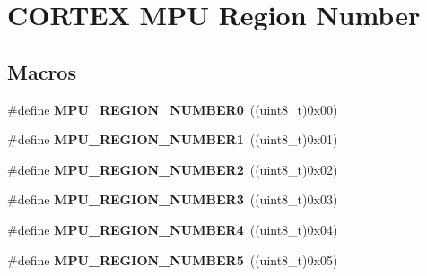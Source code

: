 \hypertarget{group___c_o_r_t_e_x___m_p_u___region___number}{}\section{C\+O\+R\+T\+EX M\+PU Region Number}
\label{group___c_o_r_t_e_x___m_p_u___region___number}
\subsection*{Macros}
\begin{DoxyCompactItemize}
\item 
\#define {\bfseries M\+P\+U\+\_\+\+R\+E\+G\+I\+O\+N\+\_\+\+N\+U\+M\+B\+E\+R0}~((uint8\+\_\+t)0x00)\hypertarget{group___c_o_r_t_e_x___m_p_u___region___number_ga53068f251f796975f404b1824d213b14}{}\label{group___c_o_r_t_e_x___m_p_u___region___number_ga53068f251f796975f404b1824d213b14}

\item 
\#define {\bfseries M\+P\+U\+\_\+\+R\+E\+G\+I\+O\+N\+\_\+\+N\+U\+M\+B\+E\+R1}~((uint8\+\_\+t)0x01)\hypertarget{group___c_o_r_t_e_x___m_p_u___region___number_ga37ddb62fe962b9ac2892f3897d4d3018}{}\label{group___c_o_r_t_e_x___m_p_u___region___number_ga37ddb62fe962b9ac2892f3897d4d3018}

\item 
\#define {\bfseries M\+P\+U\+\_\+\+R\+E\+G\+I\+O\+N\+\_\+\+N\+U\+M\+B\+E\+R2}~((uint8\+\_\+t)0x02)\hypertarget{group___c_o_r_t_e_x___m_p_u___region___number_gac742847caa0ef4ba134de7e7c4d64838}{}\label{group___c_o_r_t_e_x___m_p_u___region___number_gac742847caa0ef4ba134de7e7c4d64838}

\item 
\#define {\bfseries M\+P\+U\+\_\+\+R\+E\+G\+I\+O\+N\+\_\+\+N\+U\+M\+B\+E\+R3}~((uint8\+\_\+t)0x03)\hypertarget{group___c_o_r_t_e_x___m_p_u___region___number_ga708feb6a8e67c9cdb14d102580a26a5a}{}\label{group___c_o_r_t_e_x___m_p_u___region___number_ga708feb6a8e67c9cdb14d102580a26a5a}

\item 
\#define {\bfseries M\+P\+U\+\_\+\+R\+E\+G\+I\+O\+N\+\_\+\+N\+U\+M\+B\+E\+R4}~((uint8\+\_\+t)0x04)\hypertarget{group___c_o_r_t_e_x___m_p_u___region___number_ga553d48843769fcc4ce95969e8c039f71}{}\label{group___c_o_r_t_e_x___m_p_u___region___number_ga553d48843769fcc4ce95969e8c039f71}

\item 
\#define {\bfseries M\+P\+U\+\_\+\+R\+E\+G\+I\+O\+N\+\_\+\+N\+U\+M\+B\+E\+R5}~((uint8\+\_\+t)0x05)\hypertarget{group___c_o_r_t_e_x___m_p_u___region___number_ga4fbdfe7d4a4a5635176c9f179cfaf5db}{}\label{group___c_o_r_t_e_x___m_p_u___region___number_ga4fbdfe7d4a4a5635176c9f179cfaf5db}


\end{DoxyCompactItemize}
